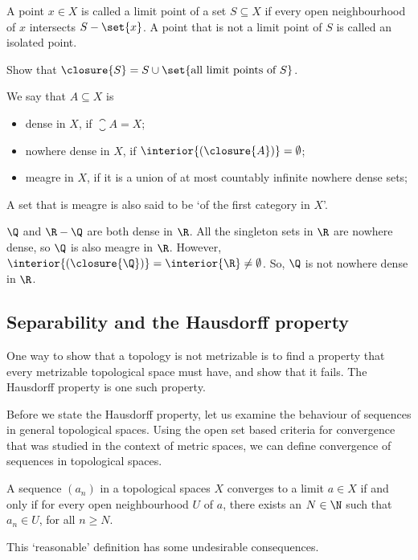 \begin{ndfn}
  A point $x \in X$ is called a limit point of a set $S \subseteq X$ if every open neighbourhood of $x$ intersects $S-\set{x}$. A point that is not a limit point of $S$ is called an isolated point.
\end{ndfn}

\begin{exercise}
  Show that $\closure{S} = S \cup \set{\text{all limit points of }S}$.
\end{exercise}

\begin{ndfn}
  We say that $A \subseteq X$ is
  \begin{itemize}
  \item dense in $X$, if $\closure{A}=X$;
  \item nowhere dense in $X$, if $\interior{(\closure{A})}=\emptyset$;
  \item meagre in $X$, if it is a union of at most countably infinite nowhere dense sets;
  \end{itemize}
\end{ndfn}
A set that is meagre is also said to be `of the first category in $X$'.

\begin{negg}
  $\Q$ and $\R-\Q$ are both dense in $\R$. All the singleton sets in $\R$ are nowhere dense, so $\Q$ is also meagre in $\R$. However, $\interior{(\closure{\Q})} = \interior{\R}\neq\emptyset$. So, $\Q$ is not nowhere dense in $\R$.
\end{negg}

\subsection{Separability and the Hausdorff property}
One way to show that a topology is not metrizable is to find a property that every metrizable topological space must have, and show that it fails. The Hausdorff property is one such property.

Before we state the Hausdorff property, let us examine the behaviour of sequences in general topological spaces. Using the open set based criteria for convergence that was studied in the context of metric spaces, we can define convergence of sequences in topological spaces.
\begin{ndfn}
  A sequence $(a_n)$ in a topological spaces $X$ converges to a limit $a \in X$ if and only if for every open neighbourhood $U$ of $a$, there exists an $N \in \N$ such that $a_n \in U$, for all $n \geq N$.
\end{ndfn}
This `reasonable' definition has some undesirable consequences.

